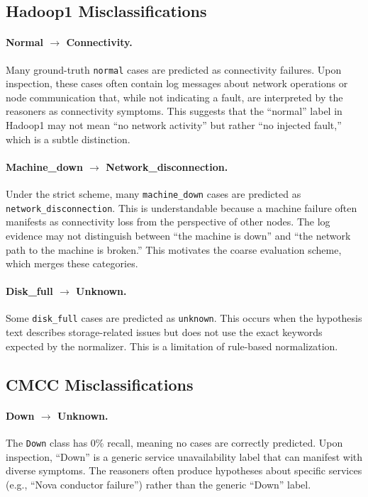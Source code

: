 \subsection{Hadoop1 Misclassifications}

\paragraph{Normal $\rightarrow$ Connectivity.}
Many ground-truth \texttt{normal} cases are predicted as connectivity failures. Upon inspection,
these cases often contain log messages about network operations or node communication that, while
not indicating a fault, are interpreted by the reasoners as connectivity symptoms. This suggests
that the ``normal'' label in Hadoop1 may not mean ``no network activity'' but rather ``no injected
fault,'' which is a subtle distinction.

\paragraph{Machine\_down $\rightarrow$ Network\_disconnection.}
Under the strict scheme, many \texttt{machine\_down} cases are predicted as
\texttt{network\_disconnection}. This is understandable because a machine failure often manifests
as connectivity loss from the perspective of other nodes. The log evidence may not distinguish
between ``the machine is down'' and ``the network path to the machine is broken.'' This motivates
the coarse evaluation scheme, which merges these categories.

\paragraph{Disk\_full $\rightarrow$ Unknown.}
Some \texttt{disk\_full} cases are predicted as \texttt{unknown}. This occurs when the hypothesis
text describes storage-related issues but does not use the exact keywords expected by the
normalizer. This is a limitation of rule-based normalization.

\subsection{CMCC Misclassifications}

\paragraph{Down $\rightarrow$ Unknown.}
The \texttt{Down} class has 0\% recall, meaning no cases are correctly predicted. Upon inspection,
``Down'' is a generic service unavailability label that can manifest with diverse symptoms. The
reasoners often produce hypotheses about specific services (e.g., ``Nova conductor failure'')
rather than the generic ``Down'' label.

